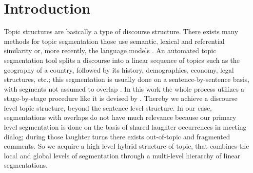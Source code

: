 \documentclass{article}
\begin{document}
\section{Introduction}
Topic structures are basically a type of discourse structure. There exists many methods for topic segmentation those use semantic, lexical and referential similarity or, more recently, the language models \cite{hearst-97,elhadad-99,utiyama-01,galley-03,malioutov-06,eisenstein-08}. An automated topic segmentation tool splits a discourse into a linear sequence of topics such as the geography of a country, followed by its history, demographics, economy, legal structures, etc.; this segmentation is usually done on a sentence-by-sentence basis, with segments not assumed to overlap \cite{webber-12}. %
In this work the whole process utilizes a stage-by-stage procedure like it is devised by \cite{grosz-86}. Thereby we achieve a discourse level topic structure, beyond the sentence level structure. In our case, segmentations with overlaps do not have much relevance because our primary level segmentation is done on the basis of shared laughter occurrences in meeting dialog; during those laughter turns there exists out-of-topic and fragmented comments. So we acquire a high level hybrid structure of topic, that combines the local and global levels of segmentation through a multi-level hierarchy of linear segmentations. %

\end{document}
